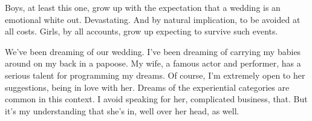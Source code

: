 

﻿Boys, at least this one, grow up with the expectation that a wedding
is an emotional white out.  Devastating.  And by natural implication,
to be avoided at all costs.  Girls, by all accounts, grow up expecting
to survive such events.


We've been dreaming of our wedding.  I've been dreaming of carrying my
babies around on my back in a papoose.  My wife, a famous actor and
performer, has a serious talent for programming my dreams.  Of course,
I'm extremely open to her suggestions, being in love with her.  Dreams
of the experiential categories are common in this context.  I avoid
speaking for her, complicated business, that.  But it's my
understanding that she's in, well over her head, as well.

\bye
